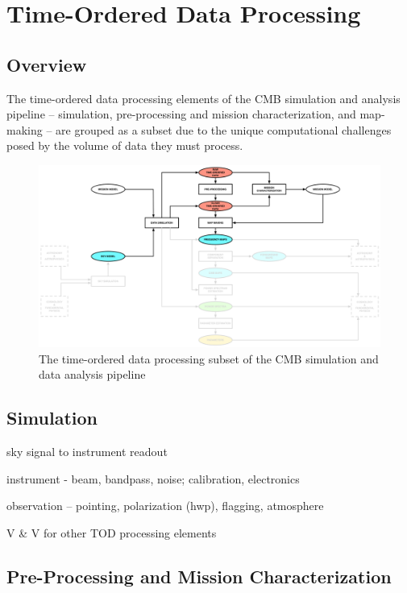  
\section{Time-Ordered Data Processing}

\subsection{Overview}

The time-ordered data processing elements of the CMB simulation and analysis pipeline -- simulation, pre-processing and mission characterization, and map-making -- are grouped as a subset due to the unique computational challenges posed by the volume of data they must process.

\begin{figure}[htbp]
\centering
\includegraphics[width=1\textwidth]{Analysis/td}
\caption{The time-ordered data processing subset of the CMB simulation and data analysis pipeline}
\label{fig_td}
\end{figure}

\subsection{Simulation}

sky signal to instrument readout

instrument - beam, bandpass, noise; calibration, electronics

observation -- pointing, polarization (hwp), flagging, atmosphere

V \& V for other TOD processing elements

\subsection{Pre-Processing and Mission Characterization}

